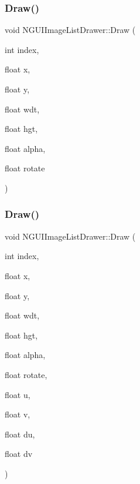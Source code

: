 \hypertarget{class_n_g_u_i_image_list_drawer_ab7405aa338242a16a809ed5df1f0afba}{}\label{class_n_g_u_i_image_list_drawer_ab7405aa338242a16a809ed5df1f0afba} 
\subsubsection{\texorpdfstring{Draw()}{Draw()}\hspace{0.1cm}{\footnotesize\ttfamily [2/3]}}
{\footnotesize\ttfamily void N\+G\+U\+I\+Image\+List\+Drawer\+::\+Draw (\begin{DoxyParamCaption}\item[{int}]{index,  }\item[{float}]{x,  }\item[{float}]{y,  }\item[{float}]{wdt,  }\item[{float}]{hgt,  }\item[{float}]{alpha,  }\item[{float}]{rotate }\end{DoxyParamCaption})}

\hypertarget{class_n_g_u_i_image_list_drawer_a1c86c9268747df86f4ffe6c071b1bdd6}{}\label{class_n_g_u_i_image_list_drawer_a1c86c9268747df86f4ffe6c071b1bdd6} 
\subsubsection{\texorpdfstring{Draw()}{Draw()}\hspace{0.1cm}{\footnotesize\ttfamily [3/3]}}
{\footnotesize\ttfamily void N\+G\+U\+I\+Image\+List\+Drawer\+::\+Draw (\begin{DoxyParamCaption}\item[{int}]{index,  }\item[{float}]{x,  }\item[{float}]{y,  }\item[{float}]{wdt,  }\item[{float}]{hgt,  }\item[{float}]{alpha,  }\item[{float}]{rotate,  }\item[{float}]{u,  }\item[{float}]{v,  }\item[{float}]{du,  }\item[{float}]{dv }\end{DoxyParamCaption})}

